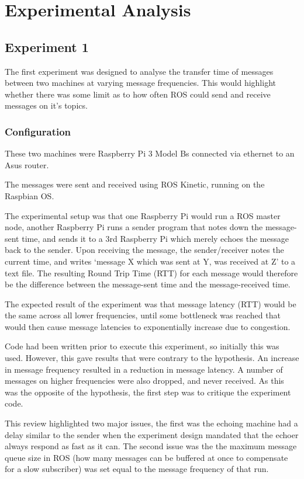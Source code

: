 \documentclass{l4proj}
\begin{document}
\chapter{Experimental Analysis}

\section{Experiment 1}

The first experiment was designed to analyse the transfer time of messages between two machines at varying message frequencies. This would highlight whether there was some limit as to how often ROS could send and receive messages on it's topics.

\subsection{Configuration}

These two machines were Raspberry Pi 3 Model Bs connected via ethernet to an Asus router.

The messages were sent and received using ROS Kinetic, running on the Raspbian OS.

The experimental setup was that one Raspberry Pi would run a ROS master node, another Raspberry Pi runs a sender program that notes down the message-sent time, and sends it to a 3rd Raspberry Pi which merely echoes the message back to the sender. Upon receiving the message, the sender/receiver notes the current time, and writes `message X which was sent at Y, was received at Z' to a text file. The resulting Round Trip Time (RTT) for each message would therefore be the difference between the message-sent time and the message-received time.

The expected result of the experiment was that message latency (RTT) would be the same across all lower frequencies, until some bottleneck was reached that would then cause message latencies to exponentially increase due to congestion.

Code had been written prior to execute this experiment, so initially this was used\cite{Experiment1InitialCode}. However, this gave results that were contrary to the hypothesis. An increase in message frequency resulted in a reduction in message latency. A number of messages on higher frequencies were also dropped, and never received. As this was the opposite of the hypothesis, the first step was to critique the experiment code.

This review highlighted two major issues, the first was the echoing machine had a delay similar to the sender when the experiment design mandated that the echoer always respond as fast as it can. The second issue was the the maximum message queue size in ROS (how many messages can be buffered at once to compensate for a slow subscriber) was set equal to the message frequency of that run.
\end{document}

